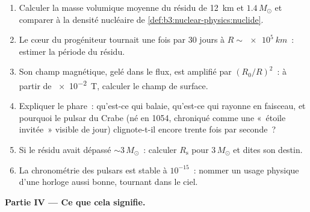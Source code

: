\begin{problem}
\begin{enumerate}[resume]
  \item Calculer la masse volumique moyenne du résidu de
        \qty{12}{km} et $1.4\,M_\odot$ et comparer à la densité
        nucléaire de
        \cref{def:b3:nuclear-physics:nuclide}.
  \item Le cœur du progéniteur tournait une fois par 30 jours à
        $R \sim \qty{e5}{km}$~: estimer la période du résidu.
  \item Son champ magnétique, gelé dans le flux, est amplifié par
        $(R_0/R)^2$~: à partir de \qty{e-2}{T}, calculer le champ de
        surface.
  \item Expliquer le phare~: qu'est-ce qui balaie, qu'est-ce qui
        rayonne en faisceau, et pourquoi le pulsar du Crabe (né en
        1054, chroniqué comme une «~étoile invitée~» visible de
        jour) clignote-t-il encore trente fois par seconde~?
  \item Si le résidu avait dépassé ${\sim}3\,M_\odot$~: calculer
        $R_{\text{s}}$ pour $3\,M_\odot$ et dites son destin.
  \item La chronométrie des pulsars est stable à $10^{-15}$~:
        nommer un usage physique d'une horloge aussi bonne, tournant
        dans le ciel.
\end{enumerate}

\medskip\noindent\textbf{Partie IV --- Ce que cela signifie.}


\end{problem}
